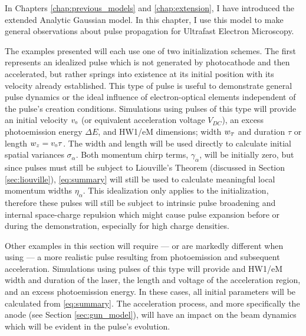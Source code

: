 
In Chapters \ref{chap:previous_models} and \ref{chap:extension}, I have introduced the extended Analytic Gaussian model.
In this chapter, I use this model to make general observations about pulse propagation for Ultrafast Electron Microscopy.

The examples presented will each use one of two initialization schemes.
The first represents an idealized pulse which is not generated by photocathode and then accelerated, but rather springs into existence at its initial position with its velocity already established.
This type of pulse is useful to demonstrate general pulse dynamics or the ideal influence of electron-optical elements independent of the pulse's creation conditions.
Simulations using pulses of this type will provide an initial velocity $v_{{\scriptscriptstyle 0}}$ (or equivalent acceleration voltage $V_{DC}$), an excess photoemission energy $\Delta E$, and HW1/eM dimensions; width $w_{{\scriptscriptstyle T}}$ and duration $\tau$ or length $ w_z = v_{{\scriptscriptstyle 0}} \tau$.
The width and length will be used directly to calculate initial spatial variances $\sigma_{\alpha}$.
Both momentum chirp terms, $\gamma_{\alpha}$, will be initially zero, but since pulses must still be subject to Liouville's Theorem (discussed in Section \ref{sec:liouville}), \ref{eq:summary} will still be used to calculate meaningful local momentum widths $\eta_{\alpha}$.
This idealization only applies to the initialization, therefore these pulses will still be subject to intrinsic pulse broadening and internal space-charge repulsion which might cause pulse expansion before or during the demonstration, especially for high charge densities.

Other examples in this section will require --- or are markedly different when using --- a more realistic pulse resulting from photoemission and subsequent acceleration.
Simulations using pulses of this type will provide and HW1/eM width and duration of the laser, the length and voltage of the acceleration region, and an excess photoemission energy.
In these cases, all initial parameters will be calculated from \ref{eq:summary}.
The acceleration process, and more specifically the anode (see Section \ref{sec:gun_model}), will have an impact on the beam dynamics which will be evident in the pulse's evolution.

